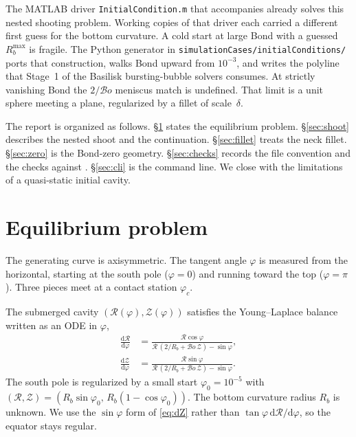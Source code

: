 \documentclass[11pt,a4paper]{article}
\newcommand{\Bo}{\mathcal{B}o}
\newcommand{\Rb}{R_b}
\begin{document}
The MATLAB driver \texttt{InitialCondition.m} that accompanies
\citet{Lhuissier2012} already solves this nested shooting problem. Working
copies of that driver each carried a different first guess for the bottom
curvature. A cold start at large Bond with a guessed $\Rb^{\mathrm{max}}$
is fragile. The Python generator in
\texttt{simulationCases/initialConditions/} ports that construction, walks
Bond upward from $10^{-3}$, and writes the polyline that Stage~1 of the
Basilisk bursting-bubble solvers \citep{Popinet2009} consumes. At strictly
vanishing Bond the $2/\Bo$ meniscus match is undefined. That limit is a
unit sphere meeting a plane, regularized by a fillet of scale~$\delta$.

The report is organized as follows.
\S\ref{sec:problem} states the equilibrium problem.
\S\ref{sec:shoot} describes the nested shoot and the continuation.
\S\ref{sec:fillet} treats the neck fillet.
\S\ref{sec:zero} is the Bond-zero geometry.
\S\ref{sec:checks} records the file convention and the checks against
\citet{Lhuissier2012}.
\S\ref{sec:cli} is the command line.
We close with the limitations of a quasi-static initial cavity.

\section{Equilibrium problem}
\label{sec:problem}

The generating curve is axisymmetric. The tangent angle $\varphi$ is
measured from the horizontal, starting at the south pole
($\varphi=0$) and running toward the top ($\varphi=\pi$). Three pieces
meet at a contact station $\varphi_c$.

The submerged cavity $(\mathcal{R}(\varphi),\mathcal{Z}(\varphi))$
satisfies the Young--Laplace balance written as an ODE in $\varphi$,
\begin{align}
  \frac{\mathrm{d}\mathcal{R}}{\mathrm{d}\varphi}
  &=
  \frac{\mathcal{R}\cos\varphi}{\mathcal{R}\,(2/\Rb + \Bo\,\mathcal{Z})-\sin\varphi},
  \label{eq:dR}
  \\
  \frac{\mathrm{d}\mathcal{Z}}{\mathrm{d}\varphi}
  &=
  \frac{\mathcal{R}\sin\varphi}{\mathcal{R}\,(2/\Rb + \Bo\,\mathcal{Z})-\sin\varphi}.
  \label{eq:dZ}
\end{align}
The south pole is regularized by a small start $\varphi_0=10^{-5}$ with
$(\mathcal{R},\mathcal{Z})=(\Rb\sin\varphi_0,\,\Rb(1-\cos\varphi_0))$.
The bottom curvature radius $\Rb$ is unknown. We use the
$\sin\varphi$ form of \eqref{eq:dZ} rather than
$\tan\varphi\,\mathrm{d}\mathcal{R}/\mathrm{d}\varphi$, so the equator
stays regular.
\end{document}

